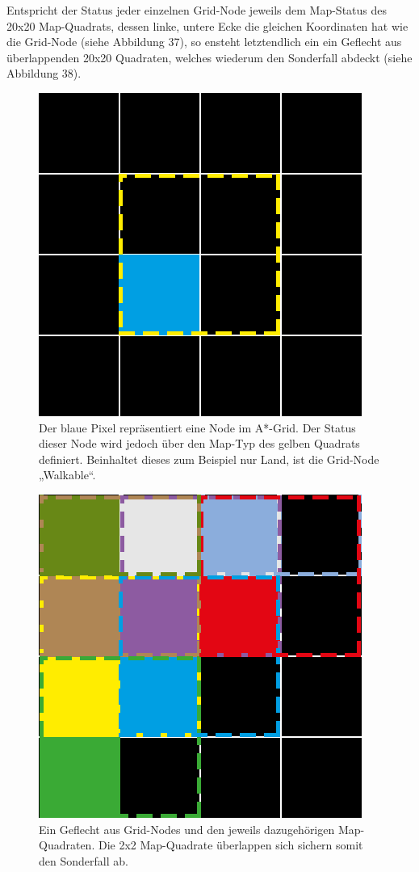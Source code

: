 \documentclass[a4paper,12pt]{article}
\begin{document}
Entspricht der Status jeder einzelnen Grid-Node jeweils dem Map-Status des 20x20 Map-Quadrats, dessen linke, untere Ecke die gleichen Koordinaten hat wie die Grid-Node (siehe Abbildung 37), so ensteht letztendlich ein ein Geflecht aus überlappenden 20x20 Quadraten, welches wiederum den Sonderfall abdeckt (siehe Abbildung 38).

\begin{figure}[H]
\centering
    \includegraphics[width=.8\linewidth]{Bilder/Aufgabe3/Teilaufgabe_A/AStar_Grid.png}
    \caption{Der blaue Pixel repräsentiert eine Node im A*-Grid. Der Status dieser Node wird jedoch über den Map-Typ des gelben Quadrats definiert. Beinhaltet dieses zum Beispiel nur Land, ist die Grid-Node „Walkable“.}
\end{figure}

\begin{figure}[H]
\centering
    \includegraphics[width=.8\linewidth]{Bilder/Aufgabe3/Teilaufgabe_A/AStar_Grid_02.png}
    \caption{Ein Geflecht aus Grid-Nodes und den jeweils dazugehörigen Map-Quadraten. Die 2x2 Map-Quadrate überlappen sich sichern somit den Sonderfall ab.}
\end{figure}
\end{document}
